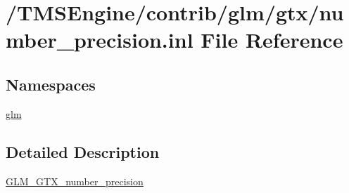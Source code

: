 \hypertarget{number__precision_8inl}{}\section{/\+T\+M\+S\+Engine/contrib/glm/gtx/number\+\_\+precision.inl File Reference}
\label{number__precision_8inl}
\subsection*{Namespaces}
\begin{DoxyCompactItemize}
\item 
 \hyperlink{namespaceglm}{glm}
\end{DoxyCompactItemize}


\subsection{Detailed Description}
\hyperlink{group__gtx__number__precision}{G\+L\+M\+\_\+\+G\+T\+X\+\_\+number\+\_\+precision} 